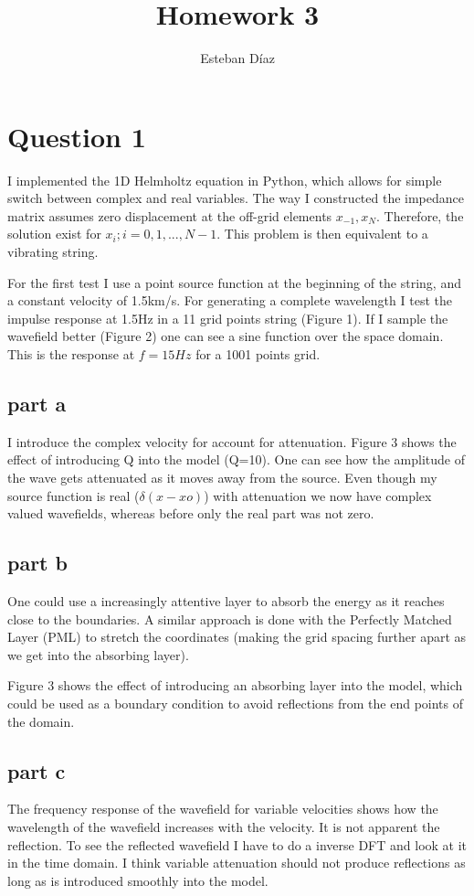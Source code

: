 \documentclass[10pt]{article}
\author{Esteban D\'{i}az}
\title{Homework 3}{}
\begin{document}
\maketitle

\section{Question 1}
I implemented the 1D Helmholtz equation in Python, which allows for simple
switch between complex and real variables. The way I constructed the impedance matrix assumes zero displacement at the off-grid elements $x_{-1},x_{N}$. Therefore, the solution exist for $x_i; i=0,1,...,N-1$. This problem is then equivalent to a vibrating string. 

For the first test I use a point source function at the beginning of the string, and a constant velocity of 1.5km/s. For generating a complete wavelength I test the impulse response at 1.5Hz in a 11 grid points string (Figure 1). If I sample the wavefield better (Figure 2) one can see a sine function over the space domain. This is the response at $f=15Hz$ for a 1001 points grid.

\subsection{part a}
I introduce the complex velocity for account for attenuation. Figure 3 shows the effect of introducing Q into the model (Q=10). One can see how the amplitude of the wave gets attenuated as it moves away from the source. Even though my source function is real ($\delta(x-xo)$) with attenuation we now have complex valued wavefields, whereas before only the real part was not zero.
\subsection{part b}
One could use a increasingly attentive layer to absorb the energy as it reaches close to the boundaries. A similar approach is done with the Perfectly Matched Layer (PML) to stretch the coordinates (making the grid spacing further apart as we get into the absorbing layer).

Figure 3 shows the effect of introducing an absorbing layer into the model, which could be used as a boundary condition to avoid reflections from the end points of the domain.

\subsection{part c}
The frequency response of the wavefield for variable velocities shows how the wavelength of the wavefield increases with the velocity. It is not apparent the reflection. To see the reflected wavefield I have to do a inverse DFT and look at it in the time domain. I think variable attenuation should not produce reflections as long as is introduced smoothly into the model.
\end{document}
